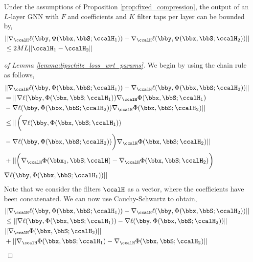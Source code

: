\begin{lemma}\label{lemma:lipschitz_loss_wrt_params}Under the assumptions of Proposition \ref{prop:fixed_compression}, the output of an $L$-layer GNN with $F$ and coefficients and $K$ filter taps per layer can be bounded by,
	\begin{align}
		&||\nabla_\ccalH\ell(\bby,\Phi(\bbx,\bbS;\ccalH_1)) - \nabla_\ccalH\ell(\bby,\Phi(\bbx,\bbS;\ccalH_2))  ||\nonumber\\
  &\leq 2ML ||\ccalH_1-\ccalH_2||
	\end{align}
\end{lemma}
\begin{proof}[of Lemma \ref{lemma:lipschitz_loss_wrt_params}] We begin by using the chain rule as follows, 
	\begin{align}
		&||\nabla_\ccalH\ell(\bby,\Phi(\bbx,\bbS;\ccalH_1)) - \nabla_\ccalH\ell(\bby,\Phi(\bbx,\bbS;\ccalH_2))  ||\\
		&=||\nabla\ell(\bby,\Phi(\bbx,\bbS;\ccalH_1))\nabla_\ccalH\Phi(\bbx,\bbS;\ccalH_1)\nonumber\\
  &- \nabla\ell(\bby,\Phi(\bbx,\bbS;\ccalH_2))\nabla_\ccalH\Phi(\bbx,\bbS;\ccalH_2)  ||\\
		&\leq||\bigg(\nabla\ell(\bby,\Phi(\bbx,\bbS;\ccalH_1)) \nonumber \\&-\nabla\ell(\bby,\Phi(\bbx,\bbS;\ccalH_2))\bigg)\nabla_\ccalH\Phi(\bbx,\bbS;\ccalH_2)  ||\\%
		&+||\bigg(\nabla_\ccalH\Phi(\bbx_1,\bbS;\ccalH)-\nabla_\ccalH\Phi(\bbx,\bbS;\ccalH_2)\bigg)\nonumber\\
  &\nabla\ell(\bby,\Phi(\bbx,\bbS;\ccalH_1))|| 
	\end{align}
	Note that we consider the filters $\ccalH$ as a vector, where the coefficients have been concatenated. We can now use Cauchy-Schwartz to obtain, 
	\begin{align}
		&||\nabla_\ccalH\ell(\bby,\Phi(\bbx,\bbS;\ccalH_1)) - \nabla_\ccalH\ell(\bby,\Phi(\bbx,\bbS;\ccalH_2))  ||\\
		&\leq||\nabla\ell(\bby,\Phi(\bbx,\bbS;\ccalH_1))- \nabla\ell(\bby,\Phi(\bbx,\bbS;\ccalH_2))|| \nonumber\\
  &||\nabla_\ccalH\Phi(\bbx,\bbS;\ccalH_2)  || \\
		&+||\nabla_\ccalH\Phi(\bbx,\bbS;\ccalH_1)-\nabla_\ccalH\Phi(\bbx,\bbS;\ccalH_2)|| \nonumber\\

\end{align}
\end{proof}

